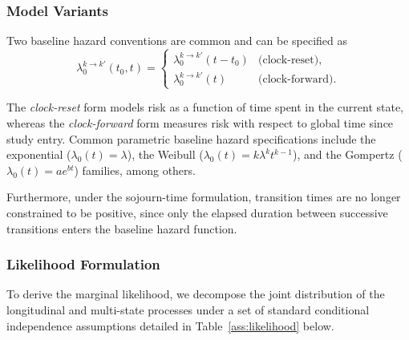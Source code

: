 \documentclass{sn-jnl}
\begin{document}
\subsubsection{Model Variants}

Two baseline hazard conventions are common and can be specified as
\[
    \lambda_0^{k \to k'}(t_0, t) =
    \begin{cases}
        \lambda_0^{k \to k'}(t - t_0) &\text{(clock-reset)},   \\
        \lambda_0^{k \to k'}(t)  &\text{(clock-forward)}.
    \end{cases}
\]

The \emph{clock-reset} form models risk as a function of time spent in the current state, whereas the \emph{clock-forward} form measures risk with respect to global time since study entry. Common parametric baseline hazard specifications include the exponential ($\lambda_0(t) = \lambda$), the Weibull ($\lambda_0(t) = k \lambda^k t^{k-1}$), and the Gompertz ($\lambda_0(t)= a e^{bt}$) families, among others. 

Furthermore, under the sojourn-time formulation, transition times are no longer constrained to be positive, since only the elapsed duration between successive transitions enters the baseline hazard function.

\subsubsection{Likelihood Formulation}

To derive the marginal likelihood, we decompose the joint distribution of the longitudinal and multi-state processes under a set of standard conditional independence assumptions detailed in Table~\ref{ass:likelihood} below.
\end{document}
